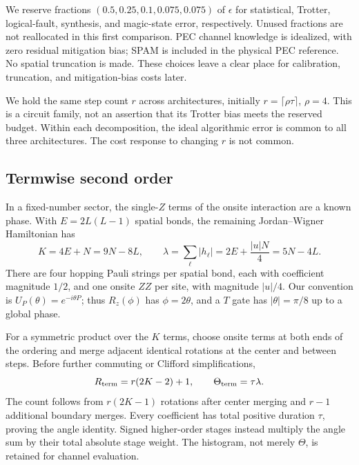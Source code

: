 \documentclass[11pt]{article}
\newcommand{\eps}{\epsilon}
\begin{document}
We reserve fractions $(0.5,0.25,0.1,0.075,0.075)$ of $\eps$ for statistical,
Trotter, logical-fault, synthesis, and magic-state error, respectively. Unused
fractions are not reallocated in this first comparison. PEC channel knowledge
is idealized, with zero residual mitigation bias; SPAM is included in the
physical PEC reference. No spatial truncation is made. These choices leave a
clear place for calibration, truncation, and mitigation-bias costs later.

We hold the same step count $r$ across architectures, initially
$r=\lceil\rho\tau\rceil$, $\rho=4$. This is a circuit family, not an assertion
that its Trotter bias meets the reserved budget. Within each decomposition,
the ideal algorithmic error is common to all three architectures. The cost
response to changing $r$ is not common.

\subsection{Termwise second order}
In a fixed-number sector, the single-$Z$ terms of the onsite interaction are
a known phase. With $E=2L(L-1)$ spatial bonds, the remaining Jordan--Wigner
Hamiltonian has
\begin{equation}
 K=4E+N=9N-8L,\qquad
 \lambda=\sum_\ell |h_\ell|=2E+\frac{|u|N}{4}=5N-4L.
\end{equation}
There are four hopping Pauli strings per spatial bond, each with coefficient
magnitude $1/2$, and one onsite $ZZ$ per site, with magnitude $|u|/4$.
Our convention is $U_P(\theta)=e^{-i\theta P}$; thus $R_z(\phi)$ has
$\phi=2\theta$, and a $T$ gate has $|\theta|=\pi/8$ up to a global phase.

For a symmetric product over the $K$ terms, choose onsite terms at both ends
of the ordering and merge adjacent identical rotations at the center and
between steps. Before further commuting or Clifford simplifications,
\begin{equation}\label{eq:termwise}
 R_{\rm term}=r(2K-2)+1,\qquad \Theta_{\rm term}=\tau\lambda.
\end{equation}
The count follows from $r(2K-1)$ rotations after center merging and $r-1$
additional boundary merges. Every coefficient has total positive duration
$\tau$, proving the angle identity. Signed higher-order stages instead
multiply the angle sum by their total absolute stage weight. The histogram,
not merely $\Theta$, is retained for channel evaluation.
\end{document}
